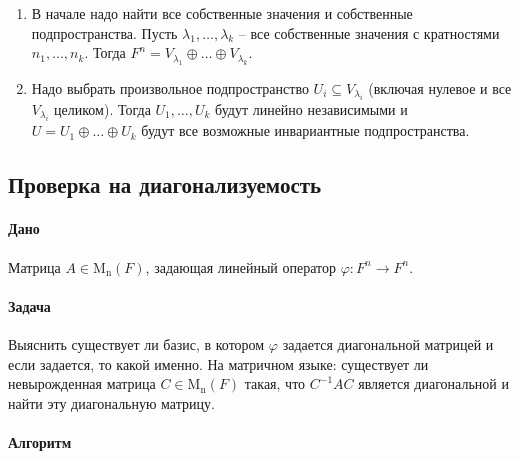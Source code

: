 \documentclass{article}
\newcommand{\Matrix}[2]{\operatorname{\mathrm{M}_{#2}}(#1)}
\begin{document}
\begin{enumerate}
\item В начале надо найти все собственные значения и собственные подпространства.
Пусть $\lambda_1,\ldots, \lambda_k$ -- все собственные значения с кратностями $n_1,\ldots,n_k$.
Тогда $F^n = V_{\lambda_1}\oplus \ldots \oplus V_{\lambda_k}$.

\item Надо выбрать произвольное подпространство $U_i\subseteq V_{\lambda_i}$ (включая нулевое и все $V_{\lambda_i}$ целиком).
Тогда $U_1,\ldots, U_k$ будут линейно независимыми и $U = U_1 \oplus \ldots \oplus U_k$ будут все возможные инвариантные подпространства.
\end{enumerate}

\subsection{Проверка на диагонализуемость}

\paragraph{Дано}

Матрица $A\in\Matrix{F}{n}$, задающая линейный оператор $\varphi\colon F^n\to F^n$.

\paragraph{Задача}

Выяснить существует ли базис, в котором $\varphi$ задается диагональной матрицей и если задается, то какой именно.
На матричном языке: существует ли невырожденная матрица $C\in \Matrix{F}{n}$ такая, что $C^{-1}AC$ является диагональной и найти эту диагональную матрицу.

\paragraph{Алгоритм}
\end{document}
